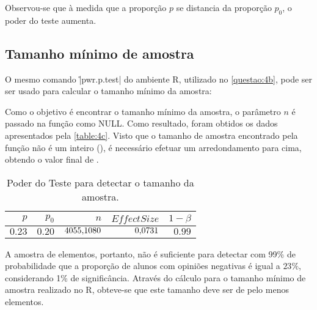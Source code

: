 	Observou-se que à medida que a proporção $p$ se distancia da proporção $p_0$, o poder do teste aumenta.

\subsection{Tamanho mínimo de amostra}
\label{questao:4c}

	O mesmo comando \r|pwr.p.test| do ambiente R, utilizado no \autoref{questao:4b}, pode ser ser usado para calcular o tamanho mínimo da amostra: 


	Como o objetivo é encontrar o tamanho mínimo da amostra, o parâmetro
	$n$ é passado na função como NULL.
	Como resultado, foram obtidos os dados apresentados pela \autoref{table:4c}. 
	Visto que o tamanho de amostra encontrado pela função não é um inteiro
	(\QUATROtamanhoAmostra), é necessário efetuar um arredondamento para cima,
	obtendo o valor final de \QUATROtamanhoAmostraRounded.

	\begin{table}[ht]
	\centering
	\caption{Poder do Teste para detectar o tamanho da amostra.} 
	\label{table:4c}
	\begin{tabular}{rrrrr}
	  \toprule
		$p$ & $p_0$ & $n$ & $Effect Size$ & $1 - \beta$ \\ 
		\midrule
		$0.23$ & $0.20$ & $\num{4055.1080}$ & $\num{0.0731}$ & $0.99$ \\ 
		\bottomrule
	\end{tabular}
	\end{table}

	A amostra de \QUATROn elementos, portanto, não é suficiente para detectar com 99\% de probabilidade que a proporção	de alunos com opiniões negativas é igual a $23\%$, considerando 1\% de significância.
	Através do cálculo para o tamanho mínimo de amostra realizado no R, 
	obteve-se que este tamanho deve ser de pelo menos \QUATROtamanhoAmostraRounded elementos.
